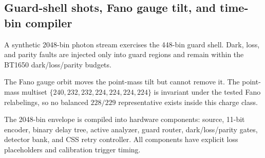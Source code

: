 \subsection{Guard-shell shots, Fano gauge tilt, and time-bin compiler}
\label{sec:bt1651-bt1653-guard-shell-hardware}

A synthetic 2048-bin photon stream exercises the 448-bin guard shell.  Dark, loss, and parity faults are injected only into guard regions and remain within the BT1650 dark/loss/parity budgets.

The Fano gauge orbit moves the point-mass tilt but cannot remove it.  The point-mass multiset $\{240,232,232,224,224,224,224\}$ is invariant under the tested Fano relabelings, so no balanced $228/229$ representative exists inside this charge class.

The 2048-bin envelope is compiled into hardware components: source, 11-bit encoder, binary delay tree, active analyzer, guard router, dark/loss/parity gates, detector bank, and CSS retry controller.  All components have explicit loss placeholders and calibration trigger timing.
